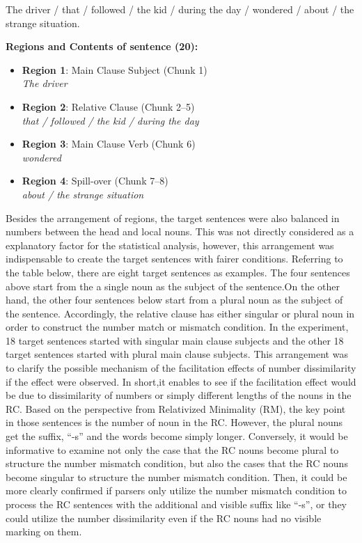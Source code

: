 \documentclass[
]{article}
\begin{document}
\noindent
The driver / that / followed / the kid / during the day / wondered / about / the strange situation.


\vspace{1em}

\noindent \textbf{Regions and Contents of sentence (20):}

\vspace{0.5em}

\begin{itemize}
  \setlength\itemsep{0.5em}
  \item \textbf{Region 1}: Main Clause Subject (Chunk 1) \\
        \textit{The driver}
  \item \textbf{Region 2}: Relative Clause (Chunk 2--5) \\
        \textit{that / followed / the kid / during the day}
  \item \textbf{Region 3}: Main Clause Verb (Chunk 6) \\
        \textit{wondered}
  \item \textbf{Region 4}: Spill-over (Chunk 7--8) \\
        \textit{about / the strange situation}
\end{itemize}

\vspace{1em}

Besides the arrangement of regions, the target sentences were also
balanced in numbers between the head and local nouns. This was not
directly considered as a explanatory factor for the statistical
analysis, however, this arrangement was indispensable to create the
target sentences with fairer conditions. Referring to the table below,
there are eight target sentences as examples. The four sentences above
start from the a single noun as the subject of the sentence.On the other
hand, the other four sentences below start from a plural noun as the
subject of the sentence. Accordingly, the relative clause has either
singular or plural noun in order to construct the number match or
mismatch condition. In the experiment, 18 target sentences started with
singular main clause subjects and the other 18 target sentences started
with plural main clause subjects. This arrangement was to clarify the
possible mechanism of the facilitation effects of number dissimilarity
if the effect were observed. In short,it enables to see if the
facilitation effect would be due to dissimilarity of numbers or simply
different lengths of the nouns in the RC. Based on the perspective from
Relativized Minimality (RM), the key point in those sentences is the
number of noun in the RC. However, the plural nouns get the suffix,
``-s'' and the words become simply longer. Conversely, it would be
informative to examine not only the case that the RC nouns become plural
to structure the number mismatch condition, but also the cases that the
RC nouns become singular to structure the number mismatch condition.
Then, it could be more clearly confirmed if parsers only utilize the
number mismatch condition to process the RC sentences with the
additional and visible suffix like ``-s'', or they could utilize the
number dissimilarity even if the RC nouns had no visible marking on
them.
\end{document}
